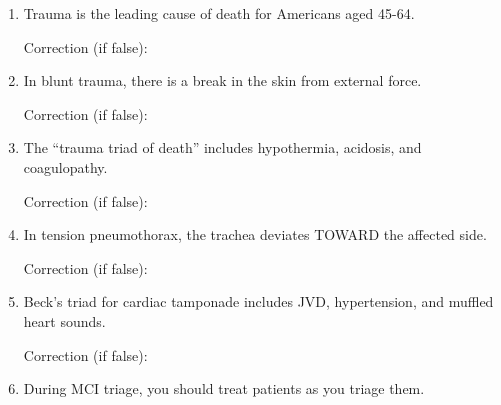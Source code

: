 \documentclass[11pt]{article}
\begin{document}
\begin{enumerate}
    \item \underline{\hspace{1cm}} Trauma is the leading cause of death for Americans aged 45-64.
    
    Correction (if false): \underline{\hspace{8cm}}
    
    \vspace{0.3cm}
    
    \item \underline{\hspace{1cm}} In blunt trauma, there is a break in the skin from external force.
    
    Correction (if false): \underline{\hspace{8cm}}
    
    \vspace{0.3cm}
    
    \item \underline{\hspace{1cm}} The ``trauma triad of death'' includes hypothermia, acidosis, and coagulopathy.
    
    Correction (if false): \underline{\hspace{8cm}}
    
    \vspace{0.3cm}
    
    \item \underline{\hspace{1cm}} In tension pneumothorax, the trachea deviates TOWARD the affected side.
    
    Correction (if false): \underline{\hspace{8cm}}
    
    \vspace{0.3cm}
    
    \item \underline{\hspace{1cm}} Beck's triad for cardiac tamponade includes JVD, hypertension, and muffled heart sounds.
    
    Correction (if false): \underline{\hspace{8cm}}
    
    \vspace{0.3cm}
    
    \item \underline{\hspace{1cm}} During MCI triage, you should treat patients as you triage them.
    

\end{enumerate}
\end{document}

